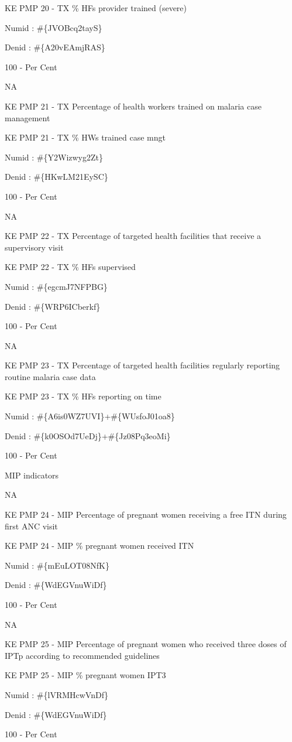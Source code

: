 \documentclass[]{book}
\begin{document}
KE PMP 20 - TX \% HFs provider trained (severe)

Numid : \#\{JVOBcq2tayS\}

Denid : \#\{A20vEAmjRAS\}

100 - Per Cent

NA

KE PMP 21 - TX Percentage of health workers trained on malaria case management

KE PMP 21 - TX \% HWs trained case mngt

Numid : \#\{Y2Wizwyg2Zt\}

Denid : \#\{HKwLM21EySC\}

100 - Per Cent

NA

KE PMP 22 - TX Percentage of targeted health facilities that receive a supervisory visit

KE PMP 22 - TX \% HFs supervised

Numid : \#\{egcmJ7NFPBG\}

Denid : \#\{WRP6ICberkf\}

100 - Per Cent

NA

KE PMP 23 - TX Percentage of targeted health facilities regularly reporting routine malaria case data

KE PMP 23 - TX \% HFs reporting on time

Numid : \#\{A6is0WZ7UVI\}+\#\{WUsfoJ01oa8\}

Denid : \#\{k0OSOd7UeDj\}+\#\{Jz08Pq3eoMi\}

100 - Per Cent

MIP indicators

NA

KE PMP 24 - MIP Percentage of pregnant women receiving a free ITN during first ANC visit

KE PMP 24 - MIP \% pregnant women received ITN

Numid : \#\{mEuLOT08NfK\}

Denid : \#\{WdEGVnuWiDf\}

100 - Per Cent

NA

KE PMP 25 - MIP Percentage of pregnant women who received three doses of IPTp according to recommended guidelines

KE PMP 25 - MIP \% pregnant women IPT3

Numid : \#\{lVRMHcwVnDf\}

Denid : \#\{WdEGVnuWiDf\}

100 - Per Cent
\end{document}
